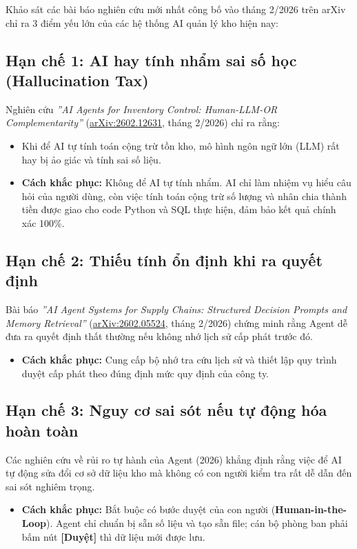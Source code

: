 \documentclass[11pt,a4paper]{article}
\begin{document}
Khảo sát các bài báo nghiên cứu mới nhất công bố vào tháng 2/2026 trên arXiv chỉ ra 3 điểm yếu lớn của các hệ thống AI quản lý kho hiện nay:

\subsection{Hạn chế 1: AI hay tính nhẩm sai số học (Hallucination Tax)}
Nghiên cứu \textit{''AI Agents for Inventory Control: Human-LLM-OR Complementarity''} (\href{https://arxiv.org/abs/2602.12631}{arXiv:2602.12631}, tháng 2/2026) chỉ ra rằng:
\begin{itemize}
    \item Khi để AI tự tính toán cộng trừ tồn kho, mô hình ngôn ngữ lớn (LLM) rất hay bị ảo giác và tính sai số liệu.
    \item \textbf{Cách khắc phục:} Không để AI tự tính nhẩm. AI chỉ làm nhiệm vụ hiểu câu hỏi của người dùng, còn việc tính toán cộng trừ số lượng và nhân chia thành tiền được giao cho code Python và SQL thực hiện, đảm bảo kết quả chính xác 100\%.
\end{itemize}

\subsection{Hạn chế 2: Thiếu tính ổn định khi ra quyết định}
Bài báo \textit{''AI Agent Systems for Supply Chains: Structured Decision Prompts and Memory Retrieval''} (\href{https://arxiv.org/abs/2602.05524}{arXiv:2602.05524}, tháng 2/2026) chứng minh rằng Agent dễ đưa ra quyết định thất thường nếu không nhớ lịch sử cấp phát trước đó.
\begin{itemize}
    \item \textbf{Cách khắc phục:} Cung cấp bộ nhớ tra cứu lịch sử và thiết lập quy trình duyệt cấp phát theo đúng định mức quy định của công ty.
\end{itemize}

\subsection{Hạn chế 3: Nguy cơ sai sót nếu tự động hóa hoàn toàn}
Các nghiên cứu về rủi ro tự hành của Agent (2026) khẳng định rằng việc để AI tự động sửa đổi cơ sở dữ liệu kho mà không có con người kiểm tra rất dễ dẫn đến sai sót nghiêm trọng.
\begin{itemize}
    \item \textbf{Cách khắc phục:} Bắt buộc có bước duyệt của con người (\textbf{Human-in-the-Loop}). Agent chỉ chuẩn bị sẵn số liệu và tạo sẵn file; cán bộ phòng ban phải bấm nút \textbf{[Duyệt]} thì dữ liệu mới được lưu.
\end{itemize}
\end{document}
